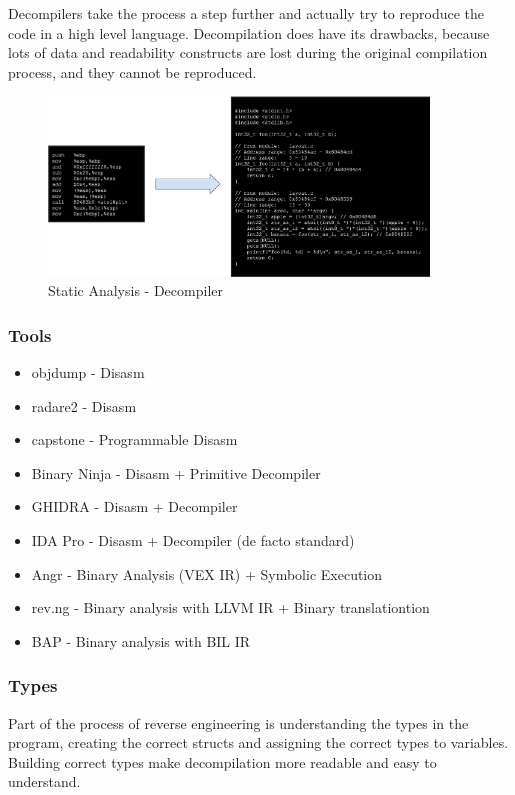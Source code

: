 \documentclass{article}
\begin{document}
Decompilers take the process a step further and actually try to reproduce the code in a high level language. 
Decompilation does have its drawbacks, because lots of data and readability constructs are lost during the original 
compilation process, and they cannot be reproduced.
\begin{figure}[H]
\centering
\includegraphics[width=0.9\textwidth]{img/decompiler.pdf}
\caption{Static Analysis - Decompiler}
\label{fig:decompiler}
\end{figure}

\subsubsection{Tools}

\begin{itemize}
\item objdump - Disasm
\item radare2 - Disasm
\item capstone - Programmable Disasm
\item Binary Ninja - Disasm + Primitive Decompiler
\item GHIDRA - Disasm + Decompiler
\item IDA Pro - Disasm + Decompiler (de facto standard)
\item Angr - Binary Analysis (VEX IR) + Symbolic Execution
\item rev.ng - Binary analysis with LLVM IR + Binary translationtion
\item BAP - Binary analysis with BIL IR
\end{itemize}

\subsubsection{Types}

Part of the process of reverse engineering is understanding the types in the program, creating the correct
structs and assigning the correct types to variables. Building correct types make decompilation more readable
and easy to understand.
\end{document}
